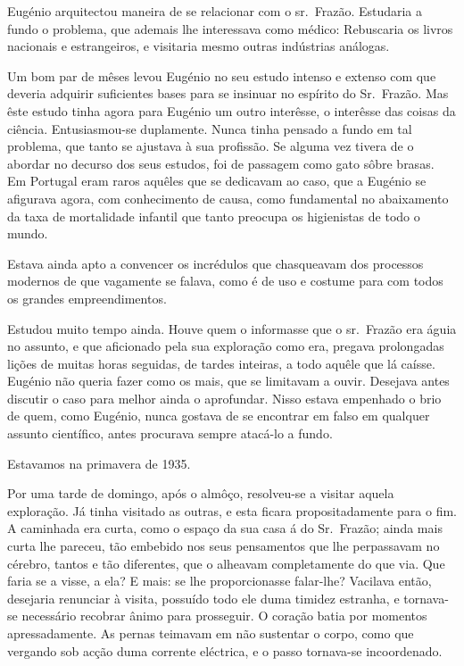 \documentclass[9pt]{article}
\begin{document}
Eugé\-nio arquitectou maneira de se relacionar com o sr.\ Frazão.
Estudaria a fundo o  problema, que ademais lhe interessava como médico:
Rebuscaria os livros nacionais e estrangeiros, e visitaria mesmo outras indústrias análogas.

Um bom par de mêses levou Eugé\-nio no seu estudo intenso e extenso com que deveria adquirir suficientes bases para se insinuar no espírito do Sr.\ Frazão. Mas êste estudo tinha agora para Eugé\-nio um
outro interêsse, o interêsse das coisas da ciência. Entusiasmou-se
duplamente. Nunca tinha pensado a fundo em tal problema, que tanto se
ajustava à sua profissão. Se alguma vez tivera de o abordar no decurso dos seus estudos, foi de passagem como gato sôbre brasas. Em Portugal eram raros a\-quê\-les que se dedicavam ao caso, que a Eugé\-nio se afigurava agora, com conhecimento de causa, como fundamental no abaixamento da taxa de mortalidade infantil que tanto preocupa os higienistas
de todo o mundo.

Estava ainda apto a convencer os incrédulos que chasqueavam dos
processos modernos de que vagamente se falava, como é de uso e costume para com todos os gran\-des empreendimentos.

Estudou muito tempo ainda. Houve quem o informasse que o sr.\ Frazão era águia no assunto, e que aficionado pela sua explora\-ção como era,
pregava prolongadas li\-ções de muitas horas seguidas, de tardes inteiras,
a todo a\-quê\-le que lá caísse. Eugé\-nio não queria fazer como os mais,
que se limitavam a ouvir. Desejava antes discutir o caso para me\-lhor
ainda o aprofundar. Nisso estava empenhado o brio de quem, como
Eugé\-nio, nunca gostava de se encontrar em falso em qualquer assunto
científico, antes procurava sempre atacá-lo a fundo.

Estavamos na primavera de 1935.

Por uma tarde de domingo, após o almôço, resolveu-se a visitar aquela explora\-ção. Já tinha visitado as outras, e esta fi\-cara propositadamente para o fim.
A caminhada era curta, como o espaço da sua casa á do Sr.\ Frazão; ainda mais curta lhe pareceu, tão embebido
nos seus pensamentos que lhe perpassavam no cérebro, tantos e tão diferentes, que o a\-lheavam completamente do
que via. Que faria se a visse, a ela?
E mais: se lhe proporcionasse falar-\-lhe? Vacilava então, desejaria renunciar à visita, possuído todo ele duma
timidez estranha, e tornava-se necessário recobrar ânimo para prosseguir. O
cora\-ção batia por momentos apressadamente. As pernas teimavam em não sustentar o corpo, como que vergando sob
ac\-ção duma corrente eléctrica, e o
passo tornava-se incoordenado.
\end{document}
